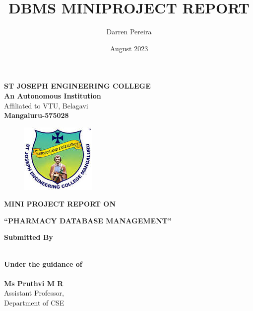 \documentclass[12pt, letter paper]{report}
\title{DBMS MINIPROJECT REPORT }
\author{Darren Pereira}
\date{August 2023}
\begin{document}
\thispagestyle{empty}
\begin{center}
\Large\textbf{ ST JOSEPH ENGINEERING COLLEGE\\ }
\textbf{An Autonomous Institution}\\
Affiliated to VTU, Belagavi\\
\textbf{Mangaluru-575028}
\end{center}

\begin{figure}[h]
 \centering
 \includegraphics[scale=1.1]{sjec.jpeg}
 \label{sjeclogo}
\end{figure}

\begin{center}
   \textbf{ MINI PROJECT REPORT ON }
\end{center}
\begin{center}
   \Large\textbf{“PHARMACY DATABASE MANAGEMENT”}
\end{center}



 
\begin{center}
   \Large \textbf{Submitted By \\}
\end{center}

\begin{center}
\end{center}
   \begin{center}
\large \textbf{\\Under the guidance of \\}
\large  \textbf{ \\Ms Pruthvi M R\\ }
\large  Assistant Professor,\\ Department of CSE
\end{center}
\end{document}
